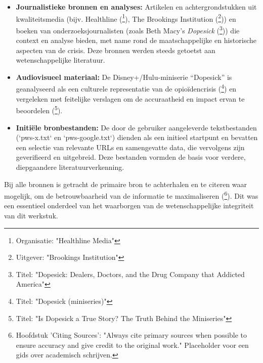\documentclass[11pt, a4paper]{report} %
\begin{document}
\begin{itemize}
    \item \textbf{Journalistieke bronnen en analyses:} Artikelen en achtergrondstukken uit kwaliteitsmedia (bijv. Healthline (\cite{HealthlineDopesickTruth}\footnote{Organisatie: "Healthline Media"}), The Brookings Institution (\cite{Brookings2017EconomicImpact}\footnote{Uitgever: "Brookings Institution"})) en boeken van onderzoeksjournalisten (zoals Beth Macy's \textit{Dopesick} (\cite{Macy2018Dopesick}\footnote{Titel: "Dopesick: Dealers, Doctors, and the Drug Company that Addicted America"})) die context en analyse bieden, met name rond de maatschappelijke en historische aspecten van de crisis. Deze bronnen werden steeds getoetst aan wetenschappelijke literatuur.
    \item \textbf{Audiovisueel materiaal:} De Disney+/Hulu-miniserie \enquote{Dopesick} is geanalyseerd als een culturele representatie van de opioïdencrisis (\cite{WikipediaDopesickMiniseries}\footnote{Titel: "Dopesick (miniseries)"}) en vergeleken met feitelijke verslagen om de accuraatheid en impact ervan te beoordelen (\cite{AvenuesRecoveryDopesickTrue}\footnote{Titel: "Is Dopesick a True Story? The Truth Behind the Miniseries"}).
    \item \textbf{Initiële bronbestanden:} De door de gebruiker aangeleverde tekstbestanden (`pws-x.txt` en `pws-google.txt`) dienden als een initieel startpunt en bevatten een selectie van relevante URLs en samengevatte data, die vervolgens zijn geverifieerd en uitgebreid. Deze bestanden vormden de basis voor verdere, diepgaandere literatuurverkenning.
\end{itemize}
Bij alle bronnen is getracht de primaire bron te achterhalen en te citeren waar mogelijk, om de betrouwbaarheid van de informatie te maximaliseren (\cite{SomeAcademicWritingGuide}\footnote{Hoofdstuk 'Citing Sources': "Always cite primary sources when possible to ensure accuracy and give credit to the original work." Placeholder voor een gids over academisch schrijven.}). Dit was een essentieel onderdeel van het waarborgen van de wetenschappelijke integriteit van dit werkstuk.
\end{document}
